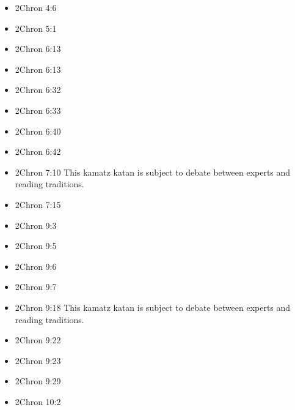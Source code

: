 \documentclass[14pt]{book}
\begin{document}
\begin{multicols}{2}
\begin{itemize}
						\item 2Chron 4:6
						
						\item 2Chron 5:1
						
						\item 2Chron 6:13
						
						\item 2Chron 6:13
						
						\item 2Chron 6:32
						
						\item 2Chron 6:33
						
						\item 2Chron 6:40
						
						\item 2Chron 6:42
						
						\item 2Chron 7:10 This kamatz katan is subject to debate between experts and reading traditions.
						
						\item 2Chron 7:15
						
						\item 2Chron 9:3
						
						\item 2Chron 9:5
						
						\item 2Chron 9:6
						
						\item 2Chron 9:7
						
						\item 2Chron 9:18 This kamatz katan is subject to debate between experts and reading traditions.
						
						\item 2Chron 9:22
						
						\item 2Chron 9:23
						
						\item 2Chron 9:29
						
						\item 2Chron 10:2
						

\end{itemize}
\end{multicols}
\end{document}
